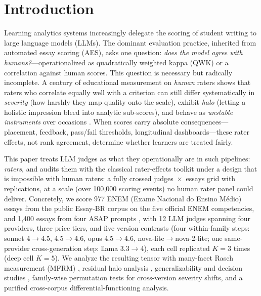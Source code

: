 \documentclass[fleqn,10pt]{JLA_article}
\affiliation{\textit{Independent Researcher --- veeru.svk@gmail.com --- this work was conducted independently of the author's employment. Preprint; cite the peer-reviewed version once available.}}
\begin{document}
\flushbottom
\maketitle
\thispagestyle{empty}

\section{Introduction}
Learning analytics systems increasingly delegate the scoring of student writing to large language
models (LLMs). The dominant evaluation practice, inherited from automated essay scoring (AES),
asks one question: \emph{does the model agree with humans?}---operationalized as quadratically
weighted kappa (QWK) or a correlation against human scores. This question is necessary but
radically incomplete. A century of educational measurement on \emph{human} raters shows that
raters who correlate equally well with a criterion can still differ systematically in
\emph{severity} (how harshly they map quality onto the scale), exhibit \emph{halo} (letting a
holistic impression bleed into analytic sub-scores), and behave as \emph{unstable instruments}
over occasions \cite{saal1980,myford2003,myford2004,engelhard1994,eckes2015}. When scores carry absolute
consequences---placement, feedback, pass/fail thresholds, longitudinal dashboards---these rater
effects, not rank agreement, determine whether learners are treated fairly.

This paper treats LLM judges as what they operationally are in such pipelines: \emph{raters}, and
audits them with the classical rater-effects toolkit under a design that is impossible with human
raters: a fully crossed judges~$\times$~essays grid with replications, at a scale (over 100{,}000 scoring events) no human rater panel could deliver. Concretely, we score 977 ENEM
(Exame Nacional do Ensino M\'edio) essays from the public Essay-BR corpus \cite{marinho2021}
on the five official ENEM competencies, and 1,400 essays from four ASAP prompts
\cite{hewlett2012}, with 12 LLM judges spanning four providers, three price tiers, and five version contrasts (four within-family steps: sonnet 4$\to$4.5, 4.5$\to$4.6, opus 4.5$\to$4.6, nova-lite$\to$nova-2-lite; one same-provider cross-generation step: llama 3.3$\to$4), each cell replicated $K{=}3$ times (deep cell $K{=}5$). We analyze
the resulting tensor with many-facet Rasch measurement (MFRM) \cite{linacre1989,eckes2015},
residual halo analysis \cite{myford2003,myford2004}, generalizability and decision studies
\cite{brennan2001}, family-wise permutation tests for cross-version severity shifts, and a
purified cross-corpus differential-functioning analysis.
\end{document}
